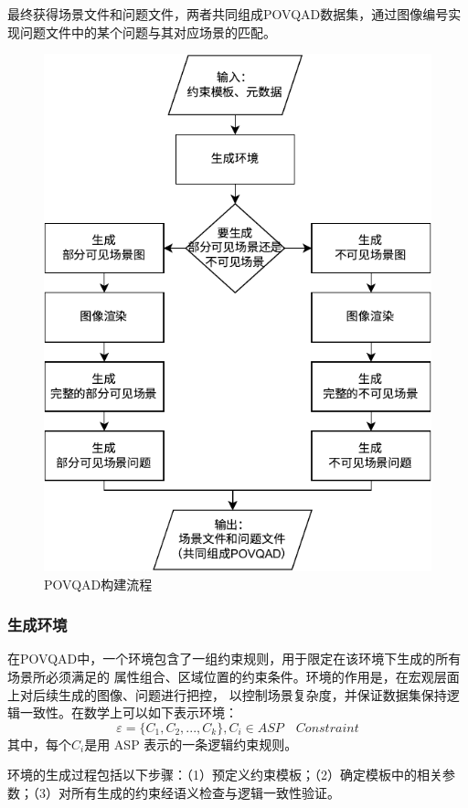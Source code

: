 最终获得场景文件和问题文件，两者共同组成POVQAD数据集，通过图像编号实现问题文件中的某个问题与其对应场景的匹配。
\begin{figure}[h]
\centering
\includegraphics{figures/pipeline-POVQAD-crop.pdf}
\caption{POVQAD构建流程}
\label{fig:dataset-generation}
\end{figure}

\subsubsection{生成环境}
在POVQAD中，一个环境包含了一组约束规则，用于限定在该环境下生成的所有场景所必须满足的
属性组合、区域位置的约束条件。环境的作用是，在宏观层面上对后续生成的图像、问题进行把控，
以控制场景复杂度，并保证数据集保持逻辑一致性。在数学上可以如下表示环境：
$$ \varepsilon = \{C_1,C_2, ..., C_k \}, C_i \in ASP \quad Constraint $$
其中，每个$C_i$是用 ASP 表示的一条逻辑约束规则。

环境的生成过程包括以下步骤：（1）预定义约束模板；（2）确定模板中的相关参数；（3）对所有生成的约束经语义检查与逻辑一致性验证。

